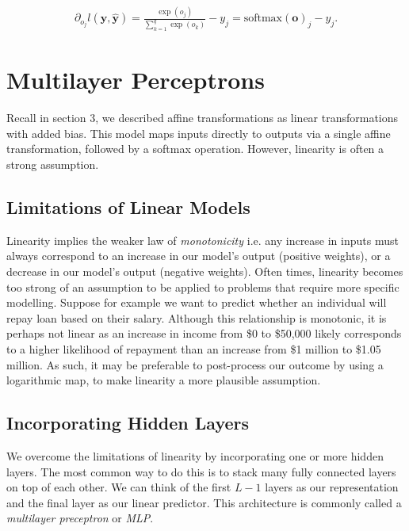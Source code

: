 \documentclass[a4paper,12pt]{article}
\theoremstyle{definition}
\begin{document}
\begin{equation*}
    \begin{aligned}
        \partial_{o_j} l(\mathbf{y}, \hat{\mathbf{y}}) = \frac{\exp(o_j)}{\sum_{k=1}^q \exp(o_k)} - y_j = \mathrm{softmax}(\mathbf{o})_j - y_j.
    \end{aligned}
\end{equation*}
\section{Multilayer Perceptrons}
Recall in section 3, we described affine transformations as linear transformations with added bias. This model maps inputs directly to
outputs via a single affine transformation, followed by a softmax operation. However, linearity is often a strong assumption.
\subsection*{Limitations of Linear Models}
Linearity implies the weaker law of \textit{monotonicity} i.e. any increase in inputs must always correspond to an increase in our model's
output (positive weights), or a decrease in our model's output (negative weights). Often times, linearity becomes too strong of an assumption
to be applied to problems that require more specific modelling. Suppose for example we want to predict whether an individual will repay loan
based on their salary. Although this relationship is monotonic, it is perhaps not linear as an increase in income from \$0 to \$50,000 likely
corresponds to a higher likelihood of repayment than an increase from \$1 million to \$1.05 million. As such, it may be preferable to
post-process our outcome by using a logarithmic map, to make linearity a more plausible assumption.
\subsection*{Incorporating Hidden Layers}
We overcome the limitations of linearity by incorporating one or more hidden layers. The most common way to do this is to stack many fully
connected layers on top of each other. We can think of the first $L-1$ layers as our representation and the final layer as our linear predictor.
This architecture is commonly called a \textit{multilayer preceptron} or \textit{MLP}.
\end{document}
